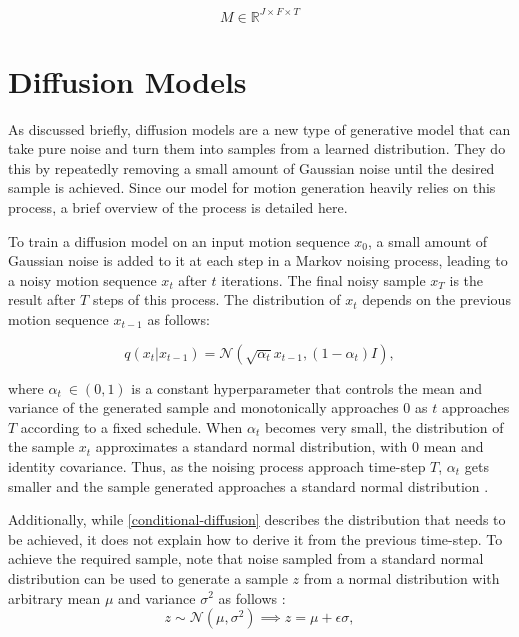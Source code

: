 \documentclass[a4paper, 12pt]{report}
\begin{document}
\begin{equation} \label{motion-tensor}
	M \in \mathbb{R}^{J \times F \times T}
\end{equation}


\section{Diffusion Models}
As discussed briefly, diffusion models are a new type of generative model that can take pure noise and turn them into samples from a learned distribution. They do this by repeatedly removing a small amount of Gaussian noise until the desired sample is achieved. Since our model for motion generation heavily relies on this process, a brief overview of the process is detailed here.

To train a diffusion model on an input motion sequence \(x_0\), a small amount of Gaussian noise is added to it at each step in a Markov noising process, leading to a noisy motion sequence \(x_t\) after \(t\) iterations. The final noisy sample \(x_T\) is the result after \(T\) steps of this process. The distribution of \(x_t\) depends on the previous motion sequence \(x_{t-1}\) as follows:

\begin{equation} \label{conditional-diffusion}
	q(x_t|x_{t-1}) = \mathcal{N}(\sqrt{\alpha_t}x_{t-1}, (1-\alpha_t)I),
\end{equation}

where \(\alpha_t\ \in (0, 1)\) is a constant hyperparameter that controls the mean and variance of the generated sample and monotonically approaches 0 as \(t\) approaches \(T\) according to a fixed schedule. When \(\alpha_t\) becomes very small, the distribution of the sample \(x_t\) approximates a standard normal distribution, with 0 mean and identity covariance. Thus, as the noising process approach time-step \(T\), \(\alpha_t\) gets smaller and the sample generated approaches a standard normal distribution \cite{ho_denoising_2020}.

Additionally, while \ref{conditional-diffusion} describes the distribution that needs to be achieved, it does not explain how to derive it from the previous time-step. To achieve the required sample, note that noise sampled from a standard normal distribution can be used to generate a sample \(z\) from a normal distribution with arbitrary mean \(\mu\) and variance \(\sigma^{2}\) as follows \cite{benjaminson_reparameterization_nodate}:
\begin{equation}
	z \sim \mathcal{N}(\mu, \sigma^{2}) \implies z = \mu + \epsilon\sigma,
\end{equation}
\end{document}
